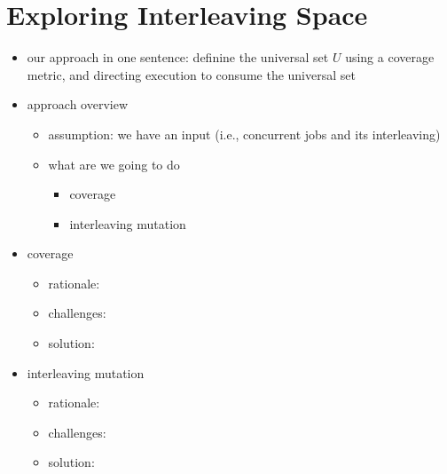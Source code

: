 \section{Exploring Interleaving Space}
\label{s:design}

\newcommand{\coverage}{XXX coverage\xspace}

\newcommand{\segment}{segment graph\xspace}
\newcommand{\segments}{segment graphs\xspace}
\newcommand{\Segments}{Segment graphs\xspace}

\newcommand{\mutable}{mutable edge\xspace}
\newcommand{\mutables}{mutable edges\xspace}
\newcommand{\immutable}{immutable edge\xspace}
\newcommand{\immutables}{immutable edges\xspace}



\begin{itemize}
\item our approach in one sentence: definine the universal set $U$
  using a coverage metric, and directing execution to consume the universal set
\item approach overview
  \begin{itemize}
    \item assumption: we have an input (i.e., concurrent jobs and its interleaving)
    \item what are we going to do
      \begin{itemize}
      \item coverage
      \item interleaving mutation
      \end{itemize}
    \end{itemize}
\item coverage
  \begin{itemize}
  \item rationale:
  \item challenges:
  \item solution:
  \end{itemize}
  \item interleaving mutation
    \begin{itemize}
    \item rationale:
    \item challenges:
    \item solution:
    \end{itemize}
\end{itemize}


